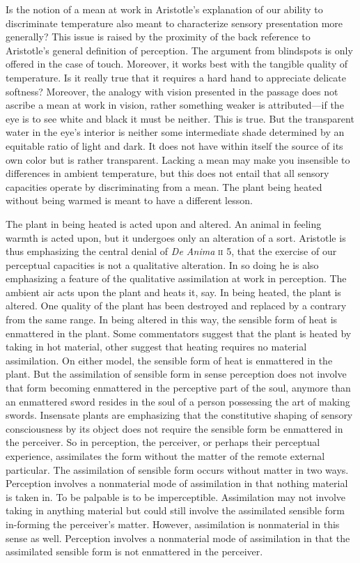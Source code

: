 Is the notion of a mean at work in Aristotle's explanation of our ability to discriminate temperature also meant to characterize sensory presentation more generally? This issue is raised by the proximity of the back reference to Aristotle's general definition of perception. The argument from blindspots is only offered in the case of touch. Moreover, it works best with the tangible quality of temperature. Is it really true that it requires a hard hand to appreciate delicate softness? Moreover, the analogy with vision presented in the passage does not ascribe a mean at work in vision, rather something weaker is attributed---if the eye is to see white and black it must be neither. This is true. But the transparent water in the eye's interior is neither some intermediate shade determined by an equitable ratio of light and dark. It does not have within itself the source of its own color but is rather transparent. Lacking a mean may make you insensible to differences in ambient temperature, but this does not entail that all sensory capacities operate by discriminating from a mean. The plant being heated without being warmed is meant to have a different lesson.

The plant in being heated is acted upon and altered. An animal in feeling warmth is acted upon, but it undergoes only an alteration of a sort. Aristotle is thus emphasizing the central denial of \emph{De Anima} \textsc{ii} 5, that the exercise of our perceptual capacities is not a qualitative alteration. In so doing he is also emphasizing a feature of the qualitative assimilation at work in perception. The ambient air acts upon the plant and heats it, say. In being heated, the plant is altered. One quality of the plant has been destroyed and replaced by a contrary from the same range. In being altered in this way, the sensible form of heat is enmattered in the plant. Some commentators suggest that the plant is heated by taking in hot material, other suggest that heating requires no material assimilation. On either model, the sensible form of heat is enmattered in the plant. But the assimilation of sensible form in sense perception does not involve that form becoming enmattered in the perceptive part of the soul, anymore than an enmattered sword resides in the soul of a person possessing the art of making swords. Insensate plants are emphasizing that the constitutive shaping of sensory consciousness by its object does not require the sensible form be enmattered in the perceiver. So in perception, the perceiver, or perhaps their perceptual experience, assimilates the form without the matter of the remote external particular. The assimilation of sensible form occurs without matter in two ways. Perception involves a nonmaterial mode of assimilation in that nothing material is taken in. To be palpable is to be imperceptible. Assimilation may not involve taking in anything material but could still involve the assimilated sensible form in-forming the perceiver's matter. However, assimilation is nonmaterial in this sense as well. Perception involves a nonmaterial mode of assimilation in that the assimilated sensible form is not enmattered in the perceiver.

